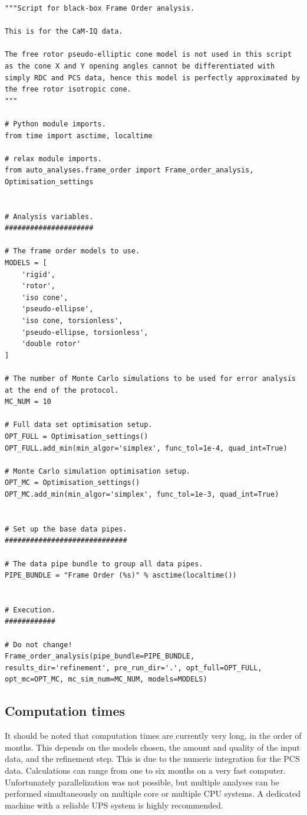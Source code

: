 \begin{lstlisting}
"""Script for black-box Frame Order analysis.

This is for the CaM-IQ data.

The free rotor pseudo-elliptic cone model is not used in this script as the cone X and Y opening angles cannot be differentiated with simply RDC and PCS data, hence this model is perfectly approximated by the free rotor isotropic cone.
"""

# Python module imports.
from time import asctime, localtime

# relax module imports.
from auto_analyses.frame_order import Frame_order_analysis, Optimisation_settings


# Analysis variables.
#####################

# The frame order models to use.
MODELS = [
    'rigid',
    'rotor',
    'iso cone',
    'pseudo-ellipse',
    'iso cone, torsionless',
    'pseudo-ellipse, torsionless',
    'double rotor'
]

# The number of Monte Carlo simulations to be used for error analysis at the end of the protocol.
MC_NUM = 10

# Full data set optimisation setup.
OPT_FULL = Optimisation_settings()
OPT_FULL.add_min(min_algor='simplex', func_tol=1e-4, quad_int=True)

# Monte Carlo simulation optimisation setup.
OPT_MC = Optimisation_settings()
OPT_MC.add_min(min_algor='simplex', func_tol=1e-3, quad_int=True)


# Set up the base data pipes.
#############################

# The data pipe bundle to group all data pipes.
PIPE_BUNDLE = "Frame Order (%s)" % asctime(localtime())


# Execution.
############

# Do not change!
Frame_order_analysis(pipe_bundle=PIPE_BUNDLE, results_dir='refinement', pre_run_dir='.', opt_full=OPT_FULL, opt_mc=OPT_MC, mc_sim_num=MC_NUM, models=MODELS)
\end{lstlisting}




\subsection{Computation times}

It should be noted that computation times are currently very long, in the order of months.
This depends on the models chosen, the amount and quality of the input data, and the refinement step.
This is due to the numeric integration for the PCS data.
Calculations can range from one to six months on a very fast computer.
Unfortunately parallelization was not possible, but multiple analyses can be performed simultaneously on multiple core or multiple CPU systems.
A dedicated machine with a reliable UPS system is highly recommended.
